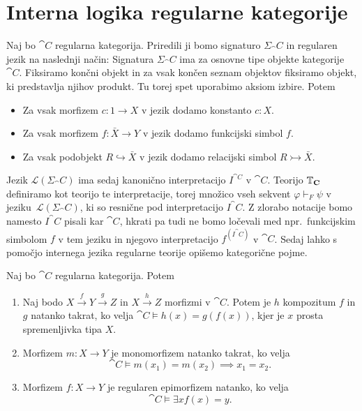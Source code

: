 \documentclass[../kategoricna_logika.tex]{subfiles}
\begin{document}
\section{Interna logika regularne kategorije}
Naj bo $\cat{C}$ regularna kategorija.  Priredili ji bomo signaturo
$\Sigma_\cat{C}$ in regularen jezik na naslednji način: Signatura
$\Sigma_\cat{C}$ ima za osnovne tipe objekte kategorije~$\cat{C}$.
Fiksiramo končni objekt in za vsak končen seznam objektov fiksiramo
objekt, ki predstavlja njihov produkt.  Tu torej spet uporabimo aksiom
izbire. Potem
\begin{itemize}
\item Za vsak morfizem $c : 1 \to X$ v jezik dodamo konstanto $c:X$.
\item Za vsak morfizem $f : \bar{X} \to Y$ v jezik dodamo funkcijski
  simbol $f$.
\item Za vsak podobjekt $R \hookrightarrow \bar{X}$ v jezik dodamo
  relacijski simbol ${R \rightarrowtail \bar{X}}$.
\end{itemize}
Jezik $\mathcal{L}(\Sigma_\cat{C})$ ima sedaj kanonično interpretacijo
$I^{\cat{C}}$ v $\cat{C}$.  Teorijo $\mathbb{T}_{\operatorname{\mathbf{C}}}$ definiramo kot teorijo
te interpretacije, torej množico vseh sekvent $\varphi \vdash_F \psi$
v jeziku~$\mathcal{L}(\Sigma_\cat{C})$, ki so resnične pod
interpretacijo $I^\cat{C}$. Z zlorabo notacije bomo namesto
$I^\cat{C}$ pisali kar $\cat{C}$, hkrati pa tudi ne bomo ločevali med
npr.\ funkcijskim simbolom $f$ v tem jeziku in njegovo interpretacijo
$f^{(I^\cat{C})}$ v $\cat{C}$.  Sedaj lahko s pomočjo internega jezika
regularne teorije opišemo kategorične pojme.
\begin{lema}\label{lema:morfizmi-v-interni-logiki}
  Naj bo $\cat{C}$ regularna kategorija. Potem
  \begin{enumerate}[label=(\roman*)]
  \item Naj bodo $X \xrightarrow{f} Y \xrightarrow{g} Z$ in
    $X \xrightarrow{h} Z$ morfizmi v $\cat{C}$.  Potem je
    $h$ kompozitum $f$ in $g$ natanko takrat, ko velja
    ${\cat{C} \models h(x) = g(f(x))}$, kjer je $x$ prosta
    spremenljivka tipa $X$.
  \item Morfizem $m : X \to Y$ je monomorfizem natanko takrat, ko
    velja
    \[\cat{C} \models m(x_1) = m(x_2) \implies x_1 = x_2. \]
  \item Morfizem $f : X \to Y$ je regularen epimorfizem natanko, ko
    velja
    \[ \cat{C} \models \exists x f(x) = y. \]
  \end{enumerate}
\end{lema}
\end{document}
